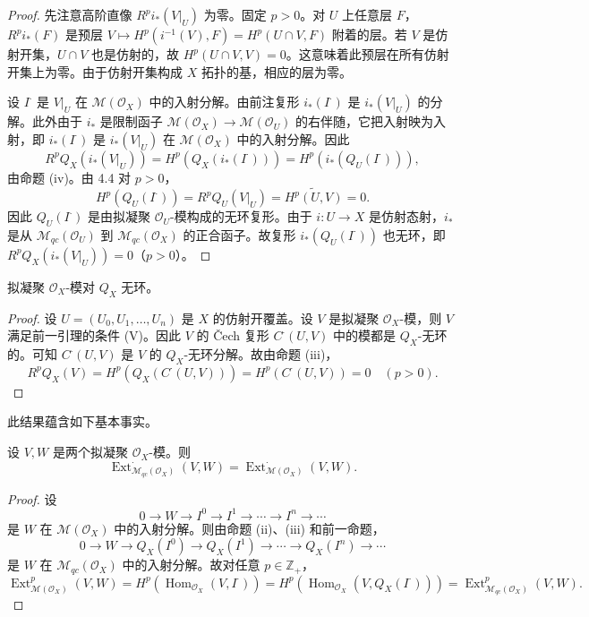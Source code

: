 \begin{proof}
先注意高阶直像 $R^pi_*(V|_U)$ 为零。固定 $p>0$。对 $U$ 上任意层 $F$，$R^pi_*(F)$ 是预层 $V\longmapsto H^p(i^{-1}(V),F)=H^p(U\cap V,F)$ 附着的层。若 $V$ 是仿射开集，$U\cap V$ 也是仿射的，故 $H^p(U\cap V,V)=0$。这意味着此预层在所有仿射开集上为零。由于仿射开集构成 $X$ 拓扑的基，相应的层为零。

设 $I^\cdot$ 是 $V|_U$ 在 $\mathcal{M}(\mathcal{O}_X)$ 中的入射分解。由前注复形 $i_*(I^\cdot)$ 是 $i_*(V|_U)$ 的分解。此外由于 $i_*$ 是限制函子 $\mathcal{M}(\mathcal{O}_X)\to\mathcal{M}(\mathcal{O}_U)$ 的右伴随，它把入射映为入射，即 $i_*(I^\cdot)$ 是 $i_*(V|_U)$ 在 $\mathcal{M}(\mathcal{O}_X)$ 中的入射分解。因此
$$R^pQ_X(i_*(V|_U))=H^p(Q_X(i_*(I^\cdot)))=H^p(i_*(Q_U(I^\cdot))),$$
由命题 (iv)。由 4.4 对 $p>0$，
$$H^p(Q_U(I^\cdot))=R^pQ_U(V|_U)=\widetilde{H^p(U,V)}=0.$$
因此 $Q_U(I^\cdot)$ 是由拟凝聚 $\mathcal{O}_U$-模构成的无环复形。由于 $i:U\to X$ 是仿射态射，$i_*$ 是从 $\mathcal{M}_{qc}(\mathcal{O}_U)$ 到 $\mathcal{M}_{qc}(\mathcal{O}_X)$ 的正合函子。故复形 $i_*(Q_U(I^\cdot))$ 也无环，即 $R^pQ_X(i_*(V|_U))=0$（$p>0$）。
\end{proof}

\begin{proposition}
拟凝聚 $\mathcal{O}_X$-模对 $Q_X$ 无环。
\end{proposition}

\begin{proof}
设 $U=(U_0,U_1,\dots,U_n)$ 是 $X$ 的仿射开覆盖。设 $V$ 是拟凝聚 $\mathcal{O}_X$-模，则 $V$ 满足前一引理的条件 (V)。因此 $V$ 的 Čech 复形 $C^\cdot(U,V)$ 中的模都是 $Q_X$-无环的。可知 $C^\cdot(U,V)$ 是 $V$ 的 $Q_X$-无环分解。故由命题 (iii)，
$$R^pQ_X(V)=H^p(Q_X(C^\cdot(U,V)))=H^p(C^\cdot(U,V))=0\quad(p>0).$$
\end{proof}

此结果蕴含如下基本事实。

\begin{theorem}
设 $V,W$ 是两个拟凝聚 $\mathcal{O}_X$-模。则
$$\operatorname{Ext}^\cdot_{\mathcal{M}_{qc}(\mathcal{O}_X)}(V,W)=\operatorname{Ext}^\cdot_{\mathcal{M}(\mathcal{O}_X)}(V,W).$$
\end{theorem}

\begin{proof}
设
$$0\longrightarrow W\longrightarrow I^0\longrightarrow I^1\longrightarrow\cdots\longrightarrow I^n\longrightarrow\cdots$$
是 $W$ 在 $\mathcal{M}(\mathcal{O}_X)$ 中的入射分解。则由命题 (ii)、(iii) 和前一命题，
$$0\longrightarrow W\longrightarrow Q_X(I^0)\longrightarrow Q_X(I^1)\longrightarrow\cdots\longrightarrow Q_X(I^n)\longrightarrow\cdots$$
是 $W$ 在 $\mathcal{M}_{qc}(\mathcal{O}_X)$ 中的入射分解。故对任意 $p\in\mathbb{Z}_+$，
$$\operatorname{Ext}^p_{\mathcal{M}(\mathcal{O}_X)}(V,W)=H^p(\operatorname{Hom}_{\mathcal{O}_X}(V,I^\cdot))=H^p(\operatorname{Hom}_{\mathcal{O}_X}(V,Q_X(I^\cdot)))=\operatorname{Ext}^p_{\mathcal{M}_{qc}(\mathcal{O}_X)}(V,W).$$
\end{proof}


